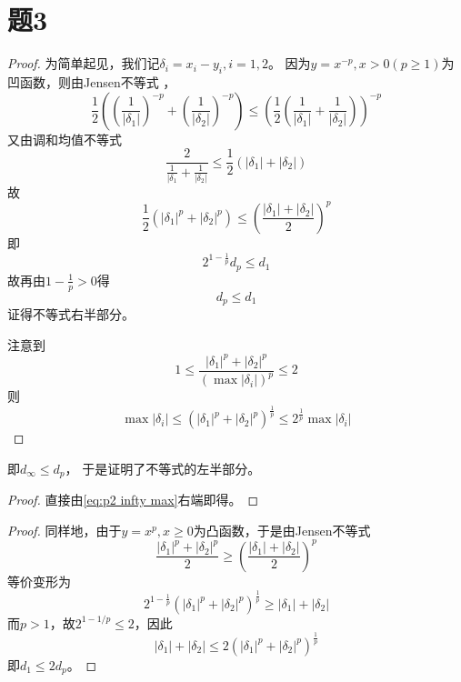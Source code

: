 \documentclass[cn]{homework}
\begin{document}
    \section{题3}
    \begin{subproblem}
        \item
        \begin{proof}
        为简单起见，我们记$\delta_i=x_i-y_i,i=1,2$。
        因为$y=x^{-p},x>0(p\geq 1)$为凹函数，则由Jensen不等式
        ，
        \begin{equation*}
            \frac{1}{2}\left(
                \left(\frac{1}{|\delta_1|}\right)^{-p}
                +\left(\frac{1}{|\delta_2|}\right)^{-p}
            \right)
            \leq\left(\frac{1}{2}\left(
                \frac{1}{|\delta_1|}
                +\frac{1}{|\delta_2|}
            \right)\right)^{-p}
        \end{equation*}
        又由调和均值不等式
        \[\frac{2}{\frac{1}{|\delta_1}+\frac{1}{|\delta_2|}}
        \leq\frac{1}{2}(|\delta_1|+|\delta_2|)\]
        故
        \[\frac{1}{2}(|\delta_1|^p+|\delta_2|^p)
        \leq\left(\frac{|\delta_1|+|\delta_2|}{2}\right)^p\]
        即
        \[2^{1-\frac{1}{p}}d_p\leq d_1\]
        故再由$1-\frac{1}{p}>0$得
        \[d_p\leq d_1\]
        证得不等式右半部分。

        注意到
        \[
            1\leq\frac{|\delta_1|^p+|\delta_2|^p}{\left(\max|\delta_i|\right)^p}\leq 2
        \]
        则
        \begin{equation}
            \label{eq:p2 infty max}
            \max|\delta_i|\leq\left(|\delta_1|^p+|\delta_2|^p\right)^\frac 1 p
            \leq 2^\frac 1 p\max|\delta_i|
        \end{equation}
        \end{proof}
        即$d_\infty\leq d_p$，
        于是证明了不等式的左半部分。

        \item
        \begin{proof}
        直接由\cref{eq:p2 infty max}右端即得。
        \end{proof}

        \item
        \begin{proof}
        同样地，由于$y=x^p,x\geq 0$为凸函数，于是由Jensen不等式
        \begin{equation*}
            \label{eq:p2 Jensen}
            \frac{|\delta_1|^p+|\delta_2|^p}{2}
            \geq\left(\frac{|\delta_1|+|\delta_2|}{2}\right)^p
        \end{equation*}
        等价变形为
        \[2^{1-\frac{1}{p}}(|\delta_1|^p+|\delta_2|^p)^\frac{1}{p}
        \geq |\delta_1|+|\delta_2|\]
        而$p>1$，故$2^{1-1/p}\leq 2$，因此
        \[|\delta_1|+|\delta_2|\leq 2(|\delta_1|^p+|\delta_2|^p)^\frac{1}{p}\]
        即$d_1\leq 2d_p$。
        \end{proof}
        

    \end{subproblem}
\end{document}
